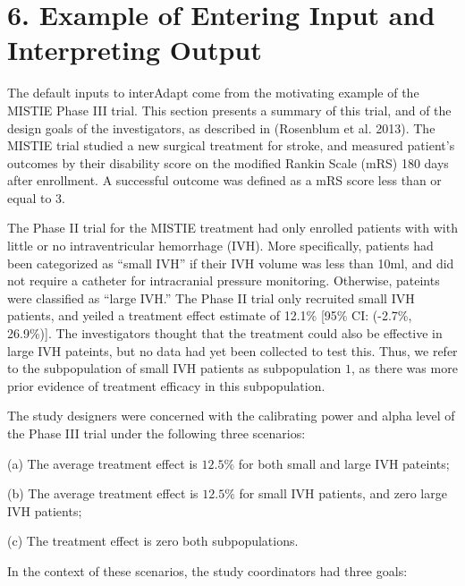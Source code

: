\documentclass{article}
\newcommand{\interAdapt}{\textsf{interAdapt }}
\begin{document}
\section*{6. Example of Entering Input and Interpreting Output}

The default inputs to \interAdapt come from the motivating example of the MISTIE Phase III trial. This section presents a summary of this trial, and of the design goals of the investigators, as described in (Rosenblum et al. 2013)\cite{Rosenblum2013AdaptMISTIE}. The MISTIE trial studied a new surgical treatment for stroke, and measured patient's outcomes by their disability score on the modified Rankin Scale (mRS) 180 days after enrollment. A successful outcome was defined as a mRS score less than or equal to 3. %

The Phase II trial for the MISTIE treatment had only enrolled patients with with little or no intraventricular hemorrhage (IVH). More specifically, patients had been categorized as ``small IVH'' if their IVH volume was less than 10ml, and did not require a catheter for intracranial pressure monitoring. Otherwise, pateints were classified as ``large IVH.'' The Phase II trial only recruited small IVH patients, and yeiled a treatment effect estimate of 12.1\% [95\% CI: (-2.7\%, 26.9\%)]. The investigators thought that the treatment could also be effective in large IVH pateints, but no data had yet been collected to test this. Thus, we refer to the subpopulation of small IVH patients as subpopulation $1$, as there was more prior evidence of treatment efficacy in this subpopulation.

 The study designers were concerned with the calibrating power and alpha level of the Phase III trial under the following three scenarios:


\begin{description}
\item  (a) The average treatment effect is $12.5\%$ for both small and large IVH pateints;
\item  (b) The average treatment effect is $12.5\%$ for small IVH patients, and zero large IVH patients;
\item  (c) The treatment effect is zero both subpopulations. 
\end{description}

In the context of these scenarios, the study coordinators had three goals:
\end{document}
